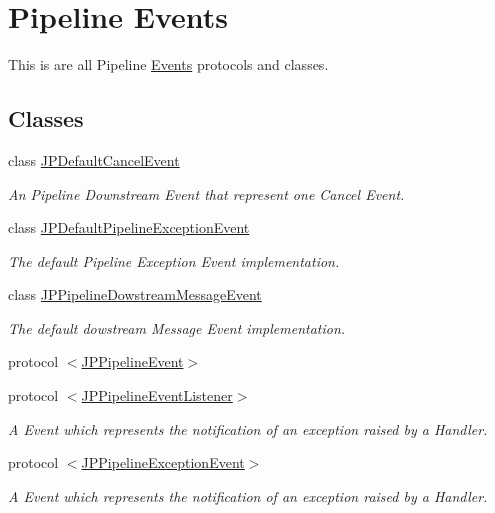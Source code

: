 \hypertarget{a00079}{
\section{Pipeline Events}
\label{a00079}
}


This is are all Pipeline \hyperlink{a00004}{Events} protocols and classes.  


\subsection*{Classes}
\begin{DoxyCompactItemize}
\item 
class \hyperlink{a00006}{JPDefaultCancelEvent}
\begin{DoxyCompactList}\small\item\em An Pipeline Downstream Event that represent one Cancel Event. \item\end{DoxyCompactList}\item 
class \hyperlink{a00008}{JPDefaultPipelineExceptionEvent}
\begin{DoxyCompactList}\small\item\em The default Pipeline Exception Event implementation. \item\end{DoxyCompactList}\item 
class \hyperlink{a00015}{JPPipelineDowstreamMessageEvent}
\begin{DoxyCompactList}\small\item\em The default dowstream Message Event implementation. \item\end{DoxyCompactList}\item 
protocol \hyperlink{a00016}{$<$JPPipelineEvent$>$}
\item 
protocol \hyperlink{a00018}{$<$JPPipelineEventListener$>$}
\begin{DoxyCompactList}\small\item\em A Event which represents the notification of an exception raised by a Handler. \item\end{DoxyCompactList}\item 
protocol \hyperlink{a00020}{$<$JPPipelineExceptionEvent$>$}
\begin{DoxyCompactList}\small\item\em A Event which represents the notification of an exception raised by a Handler. \item\end{DoxyCompactList}\item 

\end{DoxyCompactItemize}
